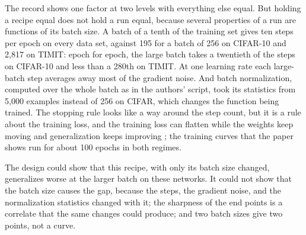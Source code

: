 \begin{refsection}
\begin{experiment}[Keskar et al.\ 2017]
\end{experiment}

The record shows one factor at two levels with everything else equal. But holding a recipe equal does not hold a run equal, because several properties of a run are functions of its batch size. A batch of a tenth of the training set gives ten steps per epoch on every data set, against 195 for a batch of 256 on CIFAR-10 and 2,817 on TIMIT: epoch for epoch, the large batch takes a twentieth of the steps on CIFAR-10 and less than a 280th on TIMIT. At one learning rate each large-batch step averages away most of the gradient noise. And batch normalization, computed over the whole batch as in the authors' script, took its statistics from 5,000 examples instead of 256 on CIFAR, which changes the function being trained. The stopping rule looks like a way around the step count, but it is a rule about the training loss, and the training loss can flatten while the weights keep moving and generalization keeps improving \parencite{HofferEtAl2017}; the training curves that the paper shows run for about 100 epochs in both regimes.

The design could show that this recipe, with only its batch size changed, generalizes worse at the larger batch on these networks. It could not show that the batch size causes the gap, because the steps, the gradient noise, and the normalization statistics changed with it; the sharpness of the end points is a correlate that the same changes could produce; and two batch sizes give two points, not a curve.


\end{refsection}
